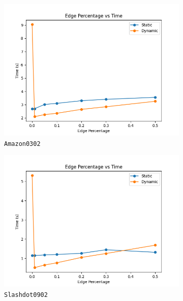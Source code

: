 \begin{figure}[h!]
    \centering
    \begin{subfigure}{0.3\textwidth}
        \centering
        \includegraphics[width=\linewidth]{./Figures/Amazon0302.out.png}
        \caption{\texttt{Amazon0302}}
    \end{subfigure}
    \hfill
    \begin{subfigure}{0.3\textwidth}
        \centering
        \includegraphics[width=\linewidth]{./Figures/Slashdot0902.out.png}
        \caption{\texttt{Slashdot0902}}
    \end{subfigure}
    \hfill
    \begin{subfigure}{0.3\textwidth}
        \centering

\end{subfigure}
\end{figure}
